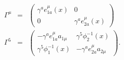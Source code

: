 \begin{equation}\label{GamM}
\begin{array}{ccc}
\Gamma^\mu & = & \left(\begin{array}{cc}
  \gamma^a e^\mu_{1a}(x) & 0 \\
  0 & \gamma^a e^\mu_{2a}(x)
\end{array}
\right) \\
\Gamma^5 & = & \left(\begin{array}{cc}
  -\gamma^a e_{1a}^\mu a_{1\mu} & \gamma^5 \phi_2^{-1}(x) \\
  \gamma^5 \phi^{-1}_1(x) & -\gamma^a e^\mu_{2a} a_{2\mu}
\end{array}
\right).
\end{array}
\end{equation}

